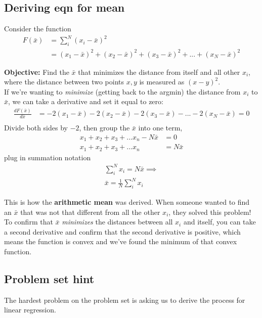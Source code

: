 \documentclass{article}
\begin{document}
\subsection{Deriving eqn for mean}
Consider the function 
\begin{align}
    F(\bar x) &= \sum_i^N (x_i - \bar x)^2\\
    &= (x_1 - \bar x)^2 + (x_2 - \bar x)^2  + (x_3 - \bar x)^2 +... + (x_N - \bar x)^2
\end{align}

\textbf{Objective:} Find the $\bar x$ that minimizes the distance from itself and all other $x_i$, where the distance between two points $x,y$ is measured as $(x -y)^2$. \\

If we're wanting to \textit{minimize} (getting back to the argmin) the distance from $x_i$ to $\bar x$, we can take a derivative and set it equal to zero: 
\begin{align}
    \frac{d F(\bar x)}{d\bar x} &= -2(x_1 - \bar x)  -2(x_2 - \bar x) -2(x_3 - \bar x) - ... -2(x_N - \bar x) = 0\\
\end{align}
Divide both sides by $-2$, then group the $\bar x$ into one term, 
\begin{align}
    x_1 + x_2 + x_3 + ... x_n - N \bar x &= 0\\
    x_1 + x_2 + x_3 + ... x_n &= N \bar x
\end{align}
plug in summation notation 
\begin{align}
    \sum_i^N x_i = N \bar x \implies \\
    \bar x = \frac{1}{N}\sum_i^N x_i
\end{align}

This is how the \textbf{arithmetic mean} was derived. When someone wanted to find an $\bar x$ that was not that different from all the other $x_i$, they solved this problem! \\

To confirm that $\bar x$ \textit{minimizes} the distances between all $x_i$ and itself, you can take a second derivative and confirm that the second derivative is positive, which means the function is convex and we've found the minimum of that convex function.  

\subsection{Problem set hint}
The hardest problem on the problem set is asking us to derive the process for linear regression. \\
\end{document}
